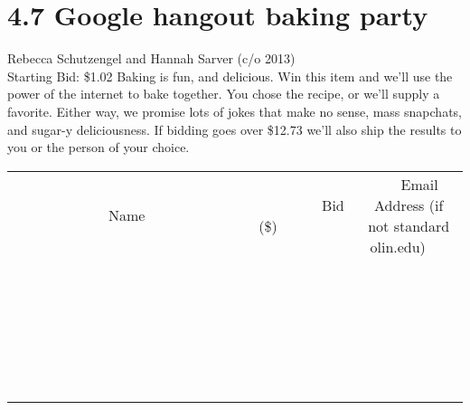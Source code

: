 \documentclass[11pt]{article}
\begin{document}
\section*{4.7 Google hangout baking party}
Rebecca Schutzengel and Hannah Sarver (c/o 2013)
\\
Starting Bid: \$1.02
\newline
Baking is fun, and delicious. Win this item and we'll use the power of the internet to bake together. You chose the recipe, or we'll supply a favorite. Either way, we promise lots of jokes that make no sense, mass snapchats, and sugar-y deliciousness. If bidding goes over \$12.73 we'll also ship the results to you or the person of your choice.
\\[6ex]
\begin{tabular}{c c c}
~~~~~~~~~~~~~Name~~~~~~~~~~~~~ & ~~~~~~~~~Bid (\$)~~~~~~~~~  & ~~~Email Address (if not standard olin.edu)~~~\\
 & & \\
\hline
 & & \\
\hline
 & & \\
\hline
 & & \\
\hline
 & & \\
\hline
 & & \\
\hline
 & & \\
\hline
 & & \\
\hline
 & & \\
\hline
 & & \\
\hline
 & & \\
\hline
 & & \\
\hline
 & & \\
\hline
 & & \\
\hline
 & & \\
\hline
 & & \\
\hline
 & & \\
\hline
 & & \\
\hline
 & & \\
\hline
 & & \\
\hline
 & & \\
\hline
 & & \\
\hline
 & & \\
\hline
 & & \\
\hline
 & & \\
\hline
 & & \\
\hline
\end{tabular}
\newpage
\end{document}

